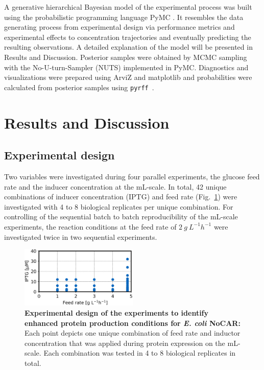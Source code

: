 \documentclass[sn-standardnature]{sn-jnl}%
\theoremstyle{thmstyleone}%
\theoremstyle{thmstyletwo}%
\theoremstyle{thmstylethree}%
\begin{document}
A generative hierarchical Bayesian model of the experimental process was built using the probabilistic programming language PyMC \cite{pymc3,pymcZenodo}.
It resembles the data generating process from experimental design via performance metrics and experimental effects to concentration trajectories and eventually predicting the resulting observations.
A detailed explanation of the model will be presented in Results and Discussion.
Posterior samples were obtained by MCMC sampling with the No-U-turn-Sampler (NUTS) implemented in PyMC.
Diagnostics and visualizations were prepared using ArviZ and matplotlib \cite{arviz,arvizPaper,matplotlib,matplotlibPaper} and probabilities were calculated from posterior samples using \texttt{pyrff}~\cite{pyrff}.



\section{Results and Discussion}
\label{sec_results}

\subsection{Experimental design}

Two variables were investigated during four parallel experiments, the glucose feed rate and the inducer concentration at the mL-scale.
In total, 42 unique combinations of inducer concentration (IPTG) and feed rate (Fig.~\ref{fig_expdesign}) were investigated with 4 to 8 biological replicates per unique combination.
For controlling of the sequential batch to batch reproducibility of the mL-scale experiments, the reaction conditions at the feed rate of 
$2\ g\ L^{-1}h^{-1}$ were investigated twice in two sequential experiments.

\begin{figure}[H]
    \centering
    \includegraphics[width=0.5\textwidth]{figures/ExpDesign.png}
    \caption{
        \textbf{Experimental design of the experiments to identify enhanced protein production conditions for \textit{E. coli} NoCAR:}
        Each point depicts one unique combination of feed rate and inductor concentration that was applied during protein expression on the mL-scale.
        Each combination was tested in 4 to 8 biological replicates in total.
    }
    \label{fig_expdesign}
\end{figure}
\end{document}
